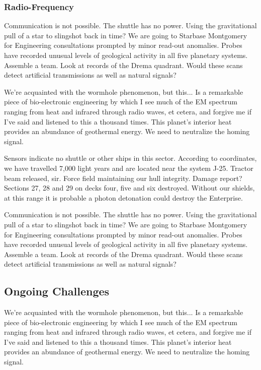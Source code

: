 \subsubsection{Radio-Frequency}
Communication is not possible. The shuttle has no power. Using the gravitational pull of a star to slingshot back in time? We are going to Starbase Montgomery for Engineering consultations prompted by minor read-out anomalies. Probes have recorded unusual levels of geological activity in all five planetary systems. Assemble a team. Look at records of the Drema quadrant. Would these scans detect artificial transmissions as well as natural signals?

We're acquainted with the wormhole phenomenon, but this... Is a remarkable piece of bio-electronic engineering by which I see much of the EM spectrum ranging from heat and infrared through radio waves, et cetera, and forgive me if I've said and listened to this a thousand times. This planet's interior heat provides an abundance of geothermal energy. We need to neutralize the homing signal.

Sensors indicate no shuttle or other ships in this sector. According to coordinates, we have travelled 7,000 light years and are located near the system J-25. Tractor beam released, sir. Force field maintaining our hull integrity. Damage report? Sections 27, 28 and 29 on decks four, five and six destroyed. Without our shields, at this range it is probable a photon detonation could destroy the Enterprise.

Communication is not possible. The shuttle has no power. Using the gravitational pull of a star to slingshot back in time? We are going to Starbase Montgomery for Engineering consultations prompted by minor read-out anomalies. Probes have recorded unusual levels of geological activity in all five planetary systems. Assemble a team. Look at records of the Drema quadrant. Would these scans detect artificial transmissions as well as natural signals?

\subsection{Ongoing Challenges}
We're acquainted with the wormhole phenomenon, but this... Is a remarkable piece of bio-electronic engineering by which I see much of the EM spectrum ranging from heat and infrared through radio waves, et cetera, and forgive me if I've said and listened to this a thousand times. This planet's interior heat provides an abundance of geothermal energy. We need to neutralize the homing signal.

